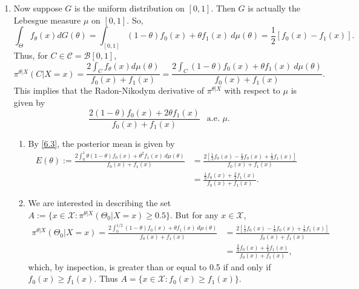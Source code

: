\documentclass[12pt]{article}
\begin{document}
\begin{enumerate}
  \item Now suppose $G$ is the uniform distribution on $[0,1]$. Then $G$ is actually the Lebesgue measure $\mu$ on $[0,1]$. So,
    \begin{equation}
      \int_{\Theta} f_{\theta}(x) dG(\theta) = \int_{[0,1]}(1-\theta)f_0(x) + \theta f_1(x)\ d\mu(\theta) = \frac{1}{2}[ f_0(x) - f_1(x) ].
      \label{6.2}
    \end{equation}
    Thus, for $C \in \mathcal{C} = \mathcal{B}[0,1]$, 
    \[
      \pi^{\theta|X}(C|X=x) = \frac{ 2\int_{C}f_{\theta}(x)d\mu(\theta) }{ f_0(x) + f_1(x) } = \frac{ 2\int_{C} (1-\theta) f_0(x) + \theta f_1(x) \
      d\mu(\theta) }{ f_0(x) + f_1(x) }.
    \]
    This implies that the Radon-Nikodym derivative of $\pi^{\theta | X}$ with respect to $\mu$ is given by
    \begin{equation}
      \frac{ 2(1 - \theta) f_0(x) + 2\theta f_1(x) }{ f_0(x) + f_1(x) } \ \ \text{ a.e. } \mu.
      \label{6.3}
    \end{equation}
    \begin{enumerate}
      \item By \eqref{6.3}, the posterior mean is given by 
        \begin{align*}
          E(\theta) := \frac{ 2 \int_{0}^{1} \theta(1 - \theta) f_0(x) + \theta^{2}f_1(x) \ d\mu(\theta) }{ f_0(x) + f_1(x) } 
          & = \frac{2 \left[ \frac{1}{2}f_0(x) - \frac{1}{3}f_0(x) + \frac{1}{3}f_1(x) \right] }{ f_0(x) + f_1(x) } \\
          & = \frac{ \frac{1}{3}f_0(x) + \frac{2}{3}f_1(x) }{ f_0(x) + f_1(x) }.
        \end{align*}
      \item We are interested in describing the set $A := \{ x \in \mathcal{X} : \pi^{\theta|X}(\Theta_0|X=x) \geq 0.5 \}$. But for any $x \in
        \mathcal{X}$, 
        \begin{align*}
          \pi^{\theta | X}(\Theta_0 | X=x) = \frac{ 2\int_{0}^{1/2}(1-\theta)f_0(x) + \theta f_1(x) \ d\mu(\theta) }{ f_0(x) + f_1(x) } 
          & = \frac{ 2\left[ \frac{1}{2}f_0(x) - \frac{1}{8} f_0(x) + \frac{1}{8}f_1(x) \right] }{ f_0(x) + f_1(x) } \\
          & = \frac{ \frac{3}{4}f_0(x) + \frac{1}{4}f_1(x) }{ f_0(x) + f_1(x) },
        \end{align*}
        which, by inspection, is greater than or equal to 0.5 if and only if $f_0(x) \geq f_1(x)$.
        Thus $A = \{ x \in \mathcal{X} : f_0(x) \geq f_1(x) \}$.
    \end{enumerate}
\end{enumerate}
\end{document}
